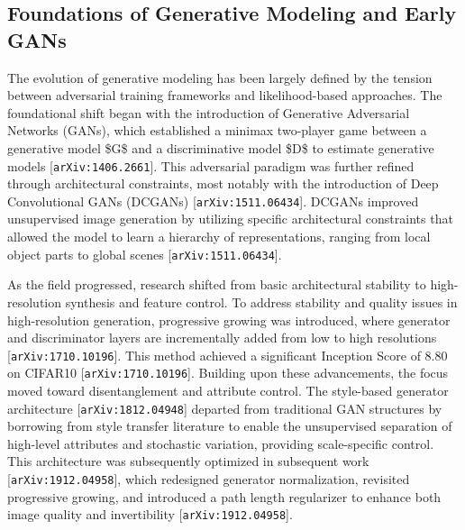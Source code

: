 \documentclass[11pt]{article}
\begin{document}
\subsection{Foundations of Generative Modeling and Early GANs}

The evolution of generative modeling has been largely defined by the tension between adversarial training frameworks and likelihood-based approaches. The foundational shift began with the introduction of Generative Adversarial Networks (GANs), which established a minimax two-player game between a generative model \$G\$ and a discriminative model \$D\$ to estimate generative models [\texttt{arXiv:1406.2661}]. This adversarial paradigm was further refined through architectural constraints, most notably with the introduction of Deep Convolutional GANs (DCGANs) [\texttt{arXiv:1511.06434}]. DCGANs improved unsupervised image generation by utilizing specific architectural constraints that allowed the model to learn a hierarchy of representations, ranging from local object parts to global scenes [\texttt{arXiv:1511.06434}].

As the field progressed, research shifted from basic architectural stability to high-resolution synthesis and feature control. To address stability and quality issues in high-resolution generation, progressive growing was introduced, where generator and discriminator layers are incrementally added from low to high resolutions [\texttt{arXiv:1710.10196}]. This method achieved a significant Inception Score of 8.80 on CIFAR10 [\texttt{arXiv:1710.10196}]. Building upon these advancements, the focus moved toward disentanglement and attribute control. The style-based generator architecture [\texttt{arXiv:1812.04948}] departed from traditional GAN structures by borrowing from style transfer literature to enable the unsupervised separation of high-level attributes and stochastic variation, providing scale-specific control. This architecture was subsequently optimized in subsequent work [\texttt{arXiv:1912.04958}], which redesigned generator normalization, revisited progressive growing, and introduced a path length regularizer to enhance both image quality and invertibility [\texttt{arXiv:1912.04958}].
\end{document}
